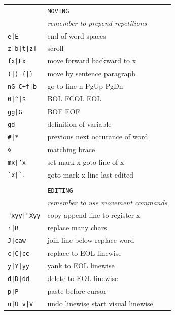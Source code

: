 \documentclass[a4paper,12pt]{article}
\begin{document}
\begin{multicols}{2}
\begin{tabular}{ll}
&\texttt{MOVING}\\
&\emph{remember to prepend repetitions}\\
\texttt{e|E}& end of word \textbar{} spaces\\
\texttt{z[b|t|z]}& scroll\\
\texttt{fx|Fx}& move forward \textbar{} backward to x\\
\texttt{(|) \{|\}}& move by sentence \textbar{} paragraph\\
\texttt{nG C+f|b}& go to line n PgUp \textbar{} PgDn\\
\texttt{0|\^{}|\$}& BOL \textbar{} FCOL \textbar{}EOL\\
\texttt{gg|G}&BOF \textbar{} EOF\\
\texttt{gd}& definition of variable\\
\texttt{\#|*}& previous \textbar{} next occurance of word\\
\texttt{\%}& matching brace\\
\texttt{mx|'x}&set mark x \textbar{} goto line of x\\
\texttt{\`{}x|\`{}.}&goto mark x \textbar{} line last edited\\
\\
&\texttt{EDITING}\\
&\emph{remember to use movement commands}\\
\texttt{"xyy|"Xyy}&copy \textbar{} append line to register x\\
\texttt{r|R}& replace \textbar{} many chars\\
\texttt{J|caw}& join line below \textbar{} replace word\\
\texttt{c|C|cc}& replace \textbar{} to EOL \textbar{} linewise\\
\texttt{y|Y|yy}& yank \textbar{} to EOL \textbar{} linewise\\
\texttt{d|D|dd}& delete \textbar{} to EOL \textbar{} linewise\\
\texttt{p|P}& paste \textbar{} before cursor\\
\texttt{u|U v|V}& undo \textbar{} linewise start visual \textbar{} linewise\\

\end{tabular}
\end{multicols}
\end{document}
